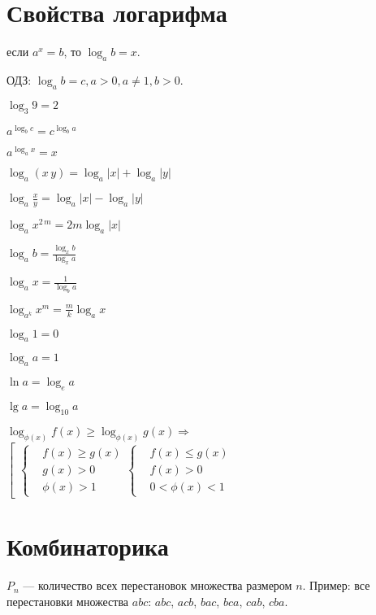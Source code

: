\section{Свойства логарифма}

\begin{center}
	если $ a^x = b $, то $ \log_a b = x $.
\end{center}

ОДЗ: $ \log_a b = c, a > 0, a \neq 1, b > 0. $

$ \log_3 9 = 2 $

$ a^{\log_b c} = c^{\log_b a} $

$ a^{\log_a x} = x $

$ \log_a (x\, y) = \log_a |x| + \log_a |y| $

$ \log_a \frac{x}{y} = \log_a |x| - \log_a |y| $

$ \log_a x^{2\, m} = 2m \log_a |x| $

$ \log_a b = \frac{\log_x b}{\log_x a} $

$ \log_a x = \frac{1}{\log_b a} $

$ \log_{a^k} x^m = \frac{m}{k} \log_a x $

$ \log_a 1 = 0 $

$ \log_a a = 1 $

$ \ln a = \log_e a $

$ \lg a = \log_{10} a $

$ \log_{\phi(x)} f(x) \ge \log_{\phi(x)} g(x) \Rightarrow $ $ \left[
\begin{aligned}
	\left\{ \begin{aligned}
		& f(x) \ge g(x) \\
		& g(x) > 0 \\
		& \phi(x) > 1
	\end{aligned} \right.
	\left\{ \begin{aligned}
		& f(x) \le g(x) \\
		& f(x) > 0 \\
		& 0 < \phi(x) < 1
	\end{aligned} \right.
\end{aligned} \right. $

	
\section{Комбинаторика}

$ P_n $ --- количество всех перестановок множества размером $ n $. Пример: все перестановки множества $abc$: $abc$, $acb$, $bac$, $bca$, $cab$, $cba$.

